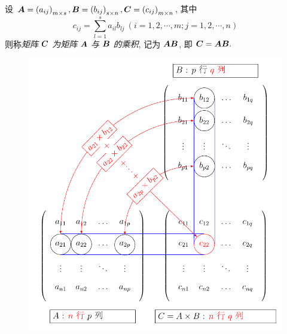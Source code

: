 \begin{definition}[矩阵乘法]
    设 $ \vb*{A}=\left(a_{i j}\right)_{m \times s}, \vb*{B}=\left(b_{i j}\right)_{s \times n}, \vb*{C}=\left(c_{i j}\right)_{m \times n} $,
    其中 $$c_{i j}=\sum_{l=1}^{s} a_{i l} b_{l j}~ (i=1,2, \cdots, m ; j=1,2, \cdots, n)$$
    则称\textit{矩阵} $ \vb*{C} $ \textit{为矩阵} $ \vb*{A} $ \textit{与} $ \vb*{B} $ \textit{的乘积},
    记为 $ \vb*{AB} $, 即 $ \vb*{C}=\vb*{AB} .$
\end{definition}

\begin{figure}[H]
    \centering
    \includegraphics[scale=0.75]{figures/matrix-multiplication.pdf}
    \caption{}
\end{figure}

